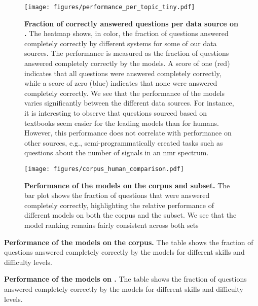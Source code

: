 \begin{figure}[htb]
    \centering
    \texttt{[image: figures/performance\_per\_topic\_tiny.pdf]}
    \caption{\textbf{Fraction of  correctly answered questions per data source on \chembenchmini.} The heatmap shows, in color, the fraction of questions answered completely correctly by different systems for some of our data sources. The performance is measured as the fraction of questions answered completely correctly by the models. A score of one (red) indicates that all questions were answered completely correctly, while a score of zero (blue) indicates that none were answered completely correctly.
        We see that the performance of the models varies significantly between the different data sources. For instance, it is interesting to observe that questions sourced based on textbooks seem easier for the leading models than for humans. However, this performance does not correlate with performance on other sources, e.g., semi-programmatically created tasks such as questions about the number of signals in an \gls{nmr} spectrum.
    }
    \label{fig:performance_per_topic_tiny}
\end{figure}


\begin{figure}[htb]
    \centering
    \texttt{[image: figures/corpus\_human\_comparison.pdf]}
    \caption{\textbf{
        Performance of the models on the \chembench corpus and \chembenchmini subset.} The bar plot shows the fraction of questions that were answered completely correctly, highlighting the relative performance of different models on both the \chembench corpus and the \chembenchmini subset.
        We see that the model ranking remains fairly consistent across both sets}  
    \label{fig:performance_corpus_and_tiny}
\end{figure}

\begin{table}
    \caption{\textbf{Performance of the models on the \chembench corpus.} The table shows the fraction of questions answered completely correctly by the models for different skills and difficulty levels.}
    \label{tab:performance_table}
\end{table}

\begin{table}
    \caption{\textbf{Performance of the models on \chembenchmini.} The table shows the fraction of questions answered completely correctly by the models for different skills and difficulty levels.}
    \label{tab:performance_table_human_subset}
\end{table}



